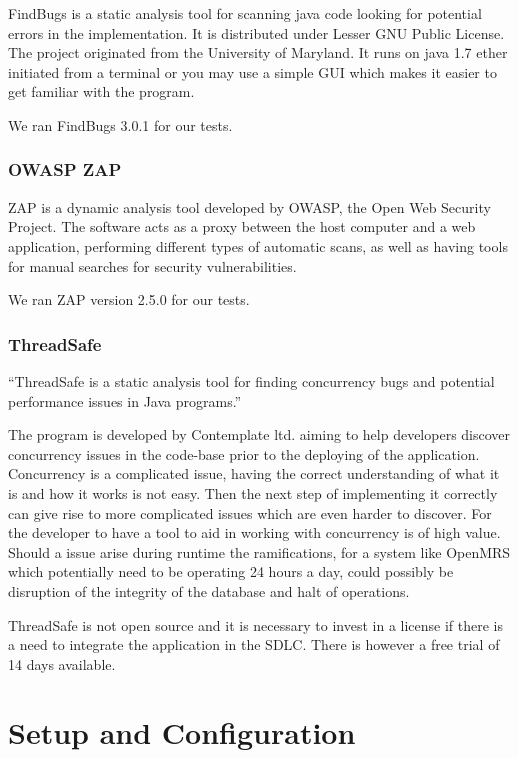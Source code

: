 \documentclass{report} %
\begin{document}
FindBugs is a static analysis tool for scanning java code looking for potential errors in the
implementation. It is distributed under Lesser GNU Public License. The project
originated from the University of Maryland.\autocite[]{FindBugs} It runs on java
1.7 ether initiated from a terminal or you may use a simple GUI which makes it
easier to get familiar with the program. 

We ran FindBugs 3.0.1 for our tests.
 

\subsection{OWASP ZAP}

ZAP is a dynamic analysis tool developed by OWASP, the Open Web Security
Project. The software acts as a proxy between the host computer and a web
application, performing different types of automatic scans, as well as having
tools for manual searches for security vulnerabilities\autocite[]{ZAP}.

We ran ZAP version 2.5.0 for our tests.

\subsection{ThreadSafe} 

``ThreadSafe is a static analysis tool for finding concurrency bugs and
potential performance issues in Java programs.''
 \autocite[]{THREADSAFE}

The program is developed by Contemplate ltd. aiming to help developers discover
concurrency issues in the code-base prior to the deploying of the application.
Concurrency is a complicated issue, having the correct understanding of
what it is and how it works is not easy. Then the next step
of implementing it correctly can give rise to more complicated issues which are
even harder to discover. For the developer to have a tool to aid in working with
concurrency is of high value. Should a issue arise during runtime the
ramifications, for a system like OpenMRS which potentially need to be operating
24 hours a day, could possibly be disruption of the integrity of the database
and halt of operations.

ThreadSafe is not open source and it is necessary to invest in a license if
there is a need to integrate the application in the SDLC. There is however a
free trial of 14 days available.

\chapter{Setup and Configuration}
\end{document}
